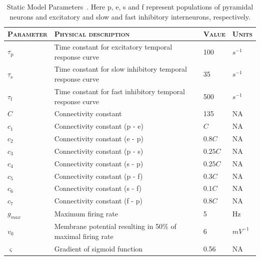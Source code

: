 \documentclass[10pt]{article}%
\begin{document}
\singlespacing 
\footnotesize
\begin{center}%
	\begin{table}
			\caption{Static Model Parameters~\citep{wendling2002epileptic}. Here p, e, s and f represent populations of pyramidal neurons and excitatory and slow and fast inhibitory interneurons, respectively.}
		\begin{tabular}{||p{2.5cm}|p{9cm}|p{1.2cm}|p{1cm}||}\hline
			 \textsc{Parameter}  & \textsc{Physical description} & \textsc{Value} & \textsc{Units}  \\\hline\hline
			 $\tau_{\mathrm{p}}$ & Time constant for excitatory temporal response curve & 100 & $s^{-1}$\\\hline
			 $\tau_{\mathrm{s}}$ & Time constant for slow inhibitory temporal response curve & 35 & $s^{-1}$\\\hline
			 $\tau_{\mathrm{f}}$ & Time constant for fast inhibitory temporal response curve & 500 & $s^{-1}$\\\hline
			 $C$ & Connectivity constant & 135 & NA\\\hline
			 $c_{1}$ & Connectivity constant (p - e) & $C$ & NA \\\hline
			 $c_{2}$ & Connectivity constant (e - p) & $0.8C$ & NA\\\hline
			 $c_{3}$ & Connectivity constant (p - s) & $0.25C$ & NA \\\hline
			 $c_{4}$ & Connectivity constant (s - p)& $0.25C$ & NA\\\hline
			 $c_{5}$ & Connectivity constant (p - f) & $0.3C$ & NA\\\hline
			 $c_{6}$ & Connectivity constant (s - f) & $0.1C$ & NA\\\hline
			 $c_{7}$ & Connectivity constant (f - p) & $0.8C$ & NA\\\hline
			 $g_{max}$ & Maximum firing rate & 5 & Hz \\\hline
			 $v_{0}$ & Membrane potential resulting in 50\% of maximal firing rate & 6 & $mV^{-1}$\\\hline
			 $\varsigma$ & Gradient of sigmoid function & 0.56 & NA \\\hline
		\end{tabular}
		\label{tab: Static}
	\end{table}
\end{center}%
\doublespacing
\normalsize
\end{document}
